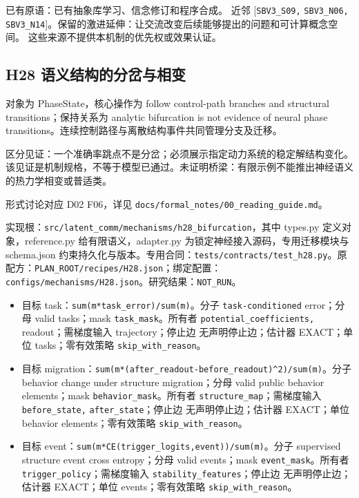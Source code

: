 \documentclass[
  10pt,
]{article}
\begin{document}
已有原语：已有抽象库学习、信念修订和程序合成。 近邻
{[}\nolinkurl{SBV3_S09,} \nolinkurl{SBV3_N06,}
\nolinkurl{SBV3_N14}{]}。保留的激进延伸：让交流改变后续能够提出的问题和可计算概念空间。
这些来源不提供本机制的优先权或效果认证。

\subsection{H28
语义结构的分岔与相变}\label{h28-ux8bedux4e49ux7ed3ux6784ux7684ux5206ux5c94ux4e0eux76f8ux53d8}

对象为 PhaseState，核心操作为 follow control-path branches and
structural transitions；保持关系为 analytic bifurcation is not evidence
of neural phase
transitions。连续控制路径与离散结构事件共同管理分支及迁移。

区分见证：一个准确率跳点不是分岔；必须展示指定动力系统的稳定解结构变化。
该见证是机制规格，不等于模型已通过。未证明桥梁：有限示例不能推出神经语义的热力学相变或普适类。

形式讨论对应 D02 F06，详见
{\small\nolinkurl{docs/formal_notes/00_reading_guide.md}}。

实现根：{\small\nolinkurl{src/latent_comm/mechanisms/h28_bifurcation}}，其中
types.py 定义对象，reference.py 给有限语义，adapter.py
为锁定神经接入源码，专用迁移模块与 schema.json
约束持久化与版本。专用合同：{\small\nolinkurl{tests/contracts/test_h28.py}}。原配方：{\small\nolinkurl{PLAN_ROOT/recipes/H28.json}}；绑定配置：{\small\nolinkurl{configs/mechanisms/H28.json}}。研究结果：\nolinkurl{NOT_RUN}。

\begin{itemize}
\item
  目标 task：{\small\nolinkurl{sum(m*task_error)/sum(m)}}。分子
  \nolinkurl{task-conditioned} error；分母 valid tasks；mask
  \nolinkurl{task_mask}。所有者 \nolinkurl{potential_coefficients,}
  readout；需梯度输入 trajectory；停止边 无声明停止边；估计器
  EXACT；单位 tasks；零有效策略 \nolinkurl{skip_with_reason}。
\item
  目标
  migration：{\small\nolinkurl{sum(m*(after_readout-before_readout)^2)/sum(m)}}。分子
  behavior change under structure migration；分母 valid public behavior
  elements；mask \nolinkurl{behavior_mask}。所有者
  \nolinkurl{structure_map}；需梯度输入 \nolinkurl{before_state,}
  \nolinkurl{after_state}；停止边 无声明停止边；估计器 EXACT；单位
  behavior elements；零有效策略 \nolinkurl{skip_with_reason}。
\item
  目标
  event：{\small\nolinkurl{sum(m*CE(trigger_logits,event))/sum(m)}}。分子
  supervised structure event cross entropy；分母 valid events；mask
  \nolinkurl{event_mask}。所有者 \nolinkurl{trigger_policy}；需梯度输入
  \nolinkurl{stability_features}；停止边 无声明停止边；估计器
  EXACT；单位 events；零有效策略 \nolinkurl{skip_with_reason}。
\end{itemize}
\end{document}
